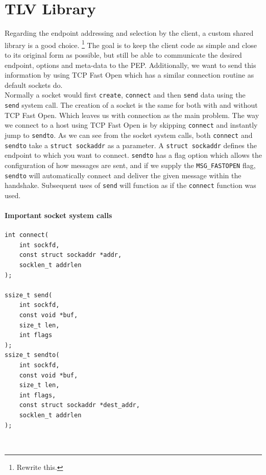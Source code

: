 \documentclass[a4paper,english, 11pt]{report}
\begin{document}
\section{TLV Library}
Regarding the endpoint addressing and selection by the client, a custom shared library is a good choice.
\footnote{Rewrite this.} The goal is to keep the client code as simple and close to its original form as possible, but still be able to communicate the desired endpoint, options and meta-data to the PEP. Additionally, we want to send this information by using TCP Fast Open which has a similar connection routine as default sockets do.\\

Normally a socket would first \verb|create|, \verb|connect| and then \verb|send| data using the \verb|send| system call. The creation of a socket is the same for both with and without TCP Fast Open. Which leaves us with connection as the main problem. The way we connect to a host using TCP Fast Open is by skipping \verb|connect| and instantly jump to \verb|sendto|. As we can see from the socket system calls, both \verb|connect| and \verb|sendto| take a \verb|struct sockaddr| as a parameter. A \verb|struct sockaddr| defines the endpoint to which you want to connect. \verb|sendto| has a flag option which allows the configuration of how messages are sent, and if we supply the \verb|MSG_FASTOPEN| flag, \verb|sendto| will automatically connect and deliver the given message within the handshake. Subsequent uses of \verb|send| will function as if the \verb|connect| function was used.\\

\noindent\begin{minipage}{\linewidth}
\paragraph{Important socket system calls}
\begin{verbatim}
int connect(
    int sockfd,
    const struct sockaddr *addr,
    socklen_t addrlen
);

ssize_t send(
    int sockfd,
    const void *buf,
    size_t len,
    int flags
);
ssize_t sendto(
    int sockfd,
    const void *buf,
    size_t len,
    int flags,
    const struct sockaddr *dest_addr,
    socklen_t addrlen
);
\end{verbatim}
\end{minipage}\\
\end{document}
